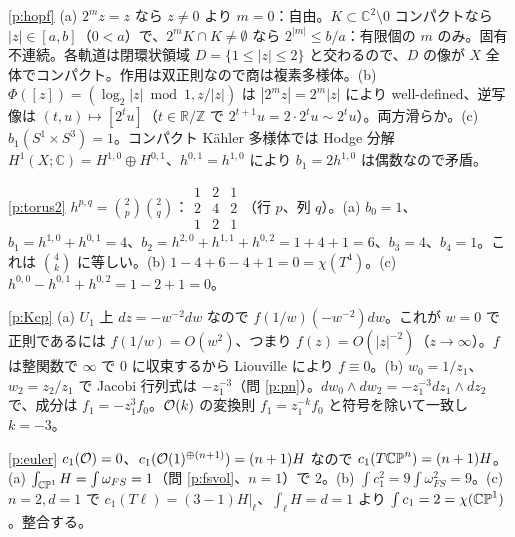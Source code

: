 \begin{sol}{\ref{p:hopf}}
(a) $2^mz=z$ なら $z\neq0$ より $m=0$：自由。$K\subset\mathbb C^2\setminus0$ コンパクトなら $|z|\in[a,b]$（$0<a$）で、$2^mK\cap K\neq\emptyset$ なら $2^{|m|}\le b/a$：有限個の $m$ のみ。固有不連続。各軌道は閉環状領域 $D=\{1\le|z|\le2\}$ と交わるので、$D$ の像が $X$ 全体でコンパクト。作用は双正則なので商は複素多様体。(b) $\Phi([z])=(\log_2|z|\bmod1,z/|z|)$ は $|2^mz|=2^m|z|$ により well-defined、逆写像は $(t,u)\mapsto[2^tu]$（$t\in\mathbb R/\mathbb Z$ で $2^{t+1}u=2\cdot2^tu\sim2^tu$）。両方滑らか。(c) $b_1(S^1\times S^3)=1$。コンパクト Kähler 多様体では Hodge 分解 $H^1(X;\mathbb C)=H^{1,0}\oplus H^{0,1}$、$h^{0,1}=h^{1,0}$ により $b_1=2h^{1,0}$ は偶数なので矛盾。
\end{sol}
\begin{sol}{\ref{p:torus2}}
$h^{p,q}=\binom2p\binom2q$：$\begin{smallmatrix}1&2&1\\2&4&2\\1&2&1\end{smallmatrix}$（行 $p$、列 $q$）。(a) $b_0=1$、$b_1=h^{1,0}+h^{0,1}=4$、$b_2=h^{2,0}+h^{1,1}+h^{0,2}=1+4+1=6$、$b_3=4$、$b_4=1$。これは $\binom4k$ に等しい。(b) $1-4+6-4+1=0=\chi(T^4)$。(c) $h^{0,0}-h^{0,1}+h^{0,2}=1-2+1=0$。
\end{sol}

\begin{sol}{\ref{p:Kcp}}
(a) $U_1$ 上 $dz=-w^{-2}dw$ なので $f(1/w)(-w^{-2})dw$。これが $w=0$ で正則であるには $f(1/w)=O(w^2)$、つまり $f(z)=O(|z|^{-2})$（$z\to\infty$）。$f$ は整関数で $\infty$ で $0$ に収束するから Liouville により $f\equiv0$。(b) $w_0=1/z_1$、$w_2=z_2/z_1$ で Jacobi 行列式は $-z_1^{-3}$（問 \ref{p:pn}）。$dw_0\wedge dw_2=-z_1^{-3}dz_1\wedge dz_2$ で、成分は $f_1=-z_1^3f_0$。$\mathcal O(k)$ の変換則 $f_1=z_1^{-k}f_0$ と符号を除いて一致し $k=-3$。
\end{sol}
\begin{sol}{\ref{p:euler}}
$c_1(\mathcal O)=0$、$c_1(\mathcal O(1)^{\oplus(n+1)})=(n+1)H$ なので $c_1(T\mathbb{CP}^n)=(n+1)H$。(a) $\int_{\mathbb{CP}^1}H=\int\omega_{FS}=1$（問 \ref{p:fsvol}、$n=1$）で $2$。(b) $\int c_1^2=9\int\omega_{FS}^2=9$。(c) $n=2,d=1$ で $c_1(T\ell)=(3-1)H|_\ell$、$\int_\ell H=d=1$ より $\int c_1=2=\chi(\mathbb{CP}^1)$。整合する。
\end{sol}

